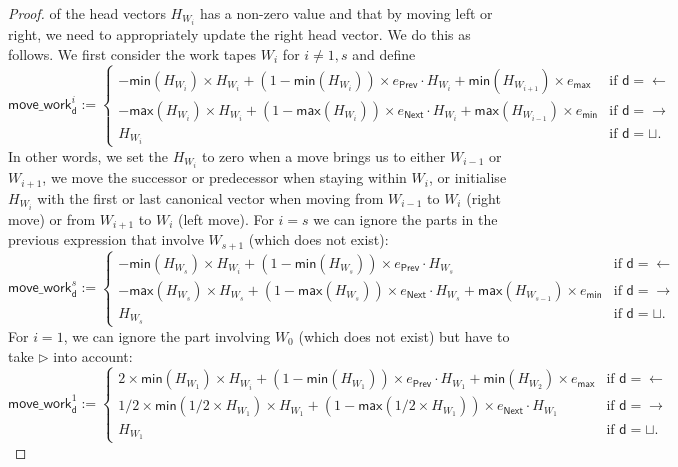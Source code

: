 \begin{proof}
of the head vectors $H_{W_i}$ has a non-zero value and that by moving left or right, we need to 
appropriately update the right head vector. We do this as follows. We first consider the work tapes 
$W_i$ for $i\neq 1,s$ and define
$$
\mathsf{move\_work}^i_{\mathsf{d}}:=
\begin{cases}
	-\mathsf{min}(H_{W_i})\times H_{W_i} + (1-\mathsf{min}(H_{W_i}))\times e_{\mathsf{Prev}}\cdot H_{W_i} + \mathsf{min}(H_{W_{i+1}})\times e_{\mathsf{max}} & \text{if $\mathsf{d}=\leftarrow$}\\
		-\mathsf{max}(H_{W_i})\times H_{W_i} + (1-\mathsf{max}(H_{W_i}))\times e_{\mathsf{Next}}\cdot H_{W_i} + \mathsf{max}(H_{W_{i-1}})\times e_{\mathsf{min}} & \text{if $\mathsf{d}=\rightarrow$}\\
	H_{W_i} & \text{if $\mathsf{d}=\sqcup$}. 	
\end{cases}
$$
In other words, we set the $H_{W_i}$ to zero when a move brings us to either $W_{i-1}$ or $W_{i+1}$, we
move the successor or predecessor when staying within $W_i$, or initialise $H_{W_i}$ with the first or 
last canonical vector when moving from $W_{i-1}$ to $W_i$ (right move) or from $W_{i+1}$ to $W_i$ (left move).
For $i=s$ we can ignore the parts in the previous expression that involve $W_{s+1}$ (which does not exist):
$$
\mathsf{move\_work}^s_{\mathsf{d}}:=
\begin{cases}
	-\mathsf{min}(H_{W_s})\times H_{W_i} + (1-\mathsf{min}(H_{W_s}))\times e_{\mathsf{Prev}}\cdot H_{W_s}  & \text{if $\mathsf{d}=\leftarrow$}\\
		-\mathsf{max}(H_{W_s}) \times H_{W_s} + (1-\mathsf{max}(H_{W_s}))\times e_{\mathsf{Next}}\cdot H_{W_s} + \mathsf{max}(H_{W_{s-1}})\times e_{\mathsf{min}} & \text{if $\mathsf{d}=\rightarrow$}\\
	H_{W_s} & \text{if $\mathsf{d}=\sqcup$}. 	
\end{cases}
$$
For $i=1$, we can ignore the part involving $W_{0}$ (which does not exist) but have to take $\rhd$ 
into account:
$$
\mathsf{move\_work}^1_{\mathsf{d}}:=
\begin{cases}
	2\times \mathsf{min}(H_{W_1})\times H_{W_i} + (1-\mathsf{min}(H_{W_1}))\times e_{\mathsf{Prev}}\cdot H_{W_1} + \mathsf{min}(H_{W_{2}})\times e_{\mathsf{max}} & \text{if $\mathsf{d}=\leftarrow$}\\
		1/2\times\mathsf{min}(1/2\times H_{W_1})\times H_{W_1} + (1-\mathsf{max}(1/2\times H_{W_1}))\times e_{\mathsf{Next}}\cdot H_{W_1}  & \text{if $\mathsf{d}=\rightarrow$}\\
	H_{W_1} & \text{if $\mathsf{d}=\sqcup$}. 	

\end{cases}$$
\end{proof}
